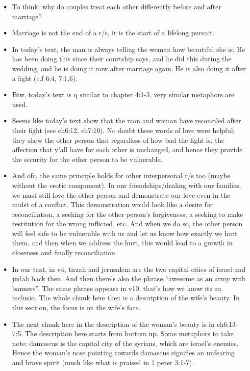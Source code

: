 \begin{itemize}
  \item{To think: why do couples treat each other differently before and after marriage?}
  \item{Marriage is not the end of a r/s, it is the start of a lifelong pursuit.}
  \item{In today’s text, the man is always telling the woman how beautiful she is. He has been doing this since their courtship says, and he did this during the wedding, and he is doing it now after marriage again. He is also doing it after a fight (c.f 6:4, 7:1,6).}
  \item{Btw, today’s text is q similar to chapter 4:1-3, very similar metaphors are used.}
  \item{Seems like today’s text show that the man and woman have reconciled after their fight (see ch6:12, ch7:10). No doubt these words of love were helpful; they show the other person that regardless of how bad the fight is, the affection that y’all have for each other is unchanged, and hence they provide the security for the other person to be vulnerable. }
  \item{And ofc, the same principle holds for other interpersonal r/s too (maybe without the erotic component). In our friendships/dealing with our families, we must still love the other person and demonstrate our love even in the midst of a conflict. This demonstration would look like a desire for reconciliation, a seeking for the other person’s forgiveness, a seeking to make restitution for the wrong inflicted, etc. And when we do so, the other person will feel safe to be vulnerable with us and let us know how exactly we hurt them, and then when we address the hurt, this would lead to a growth in closeness and finally reconciliation.}
  \item{In our text, in v4, tirzah and jerusalem are the two capital cities of israel and judah back then. And then there’s also the phrase “awesome as an army with banners”. The same phrase appears in v10, that’s how we know its an inclusio. The whole chunk here then is a description of the wife’s beauty. In this section, the focus is on the wife’s face.}
  \item{The next chunk here in the description of the woman’s beauty is in ch6:13-7:5. The description here starts from bottom up. Some metaphors to take note: damascus is the capital city of the syrians, which are israel’s enemies. Hence the woman’s nose pointing towards damascus signifies an unfearing and brave spirit (much like what is praised in 1 peter 3:1-7). }

\end{itemize}

